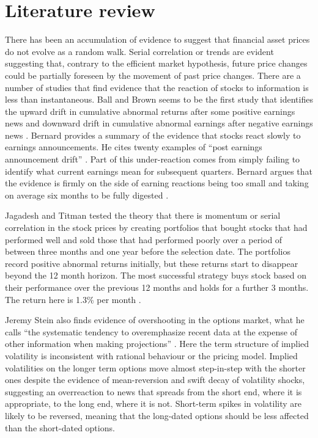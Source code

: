 \documentclass[12pt, a4paper, oneside]{article} %
\begin{document}
\section{Literature review}  
There has been an accumulation of evidence to suggest that financial asset prices do not evolve as a random walk.  Serial correlation or trends are evident suggesting that, contrary to the efficient market hypothesis, future price changes could be partially foreseen by the movement of past price changes.  There are a number of studies that find evidence that the reaction of stocks to information is less than instantaneous.  Ball and Brown seems to be the first study that identifies the upward drift in cumulative abnormal returns after some positive earnings news and downward drift in cumulative abnormal earnings after negative earnings news \citep{BallBrown}.  Bernard provides a summary of the evidence that stocks react slowly to earnings announcements.  He cites twenty examples of ``post earnings announcement drift'' \citep[p. 303]{BernardDrift}.  Part of this under-reaction comes from simply failing to identify what current earnings mean for subsequent quarters.    Bernard argues that the evidence is firmly on the side of earning reactions being too small and taking on average six months to be fully digested \citep[p. 305]{BernardDrift}. 

Jagadesh and Titman tested the theory that there is momentum or serial correlation in the stock prices by creating portfolios that bought stocks that had performed well and sold those that had performed poorly over a period of between three months and one year before the selection date.  The portfolios record positive abnormal returns initially, but these returns start to disappear beyond the 12 month horizon.  The most successful strategy buys stock based on their performance over the previous 12 months and holds for a further 3 months.  The return here is 1.3\% per month \citep{Jagadeesh}.   

Jeremy Stein also finds evidence of overshooting in the options market, what he calls ``the systematic tendency to overemphasize recent data at the expense of other information when making projections'' \citep[p 1011]{SteinOptions}. Here the term structure of implied volatility is inconsistent with rational behaviour or the pricing model.  Implied volatilities on the longer term options move almost step-in-step with the shorter ones despite the evidence of mean-reversion and swift decay of volatility shocks, suggesting an overreaction to news that spreads from the short end, where it is appropriate, to the long end, where it is not.   Short-term spikes in volatility are likely to be reversed, meaning that the long-dated options should be less affected than the short-dated options. 
\end{document}
